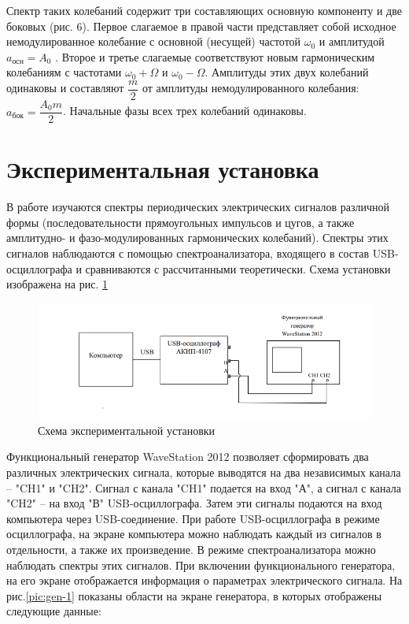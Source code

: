 \documentclass[a4paper,12pt]{article}
\begin{document}
Спектр таких колебаний содержит три составляющих  основную компоненту и две боковых (рис. 6). Первое слагаемое в правой части представляет собой исходное немодулированное колебание с основной (несущей) частотой $\omega_{0}$ и амплитудой $a_{осн} = A_{0}$ . Второе и третье слагаемые соответствуют новым гармоническим колебаниям с частотами $\omega_{0} + \Omega$ и $\omega_{0} - \Omega$. Амплитуды этих двух колебаний одинаковы и составляют $\dfrac{m}{2}$ от амплитуды немодулированного колебания: $a_{бок} = \dfrac{A_{0}m}{2}$. Начальные фазы всех трех колебаний одинаковы.

\section{Экспериментальная установка}


В работе изучаются спектры периодических электрических сигналов различной формы (последовательности прямоугольных импульсов и цугов, а также амплитудно- и фазо-модулированных гармонических колебаний). Спектры этих сигналов наблюдаются с помощью спектроанализатора, входящего в состав USB-осциллографа и сравниваются с рассчитанными теоретически. Схема установки изображена на рис. \ref{pic:ustan}

\begin{figure}[h]
    \centering
    \includegraphics[width=1\linewidth]{pictures/ustan.png}
    \caption{Схема экспериментальной установки}
    \label{pic:ustan}
\end{figure}

Функциональный генератор WaveStation 2012 позволяет сформировать два различных электрических сигнала, которые выводятся на два независимых канала – "CH1" и "CH2". Сигнал с канала "CH1" подается на вход "А", а сигнал с канала "CH2" – на вход "В" USB-осциллографа. Затем эти сигналы подаются на вход компьютера через USB-соединение. При работе USB-осциллографа в режиме осциллографа, на экране компьютера можно наблюдать каждый из сигналов в отдельности, а также их произведение. В режиме спектроанализатора можно наблюдать спектры этих сигналов. При включении функционального генератора, на его экране отображается информация о параметрах электрического сигнала. На рис.\ref{pic:gen-1} показаны области на экране генератора, в которых отображены следующие 
данные:
\end{document}
